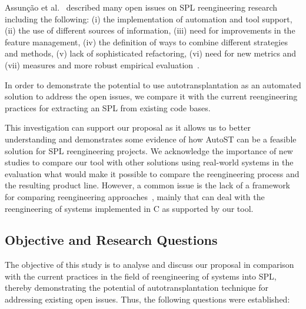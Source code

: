 Assunção et al.~\cite{Assuncao2017} described many open issues on SPL reengineering research including the following: (i) the implementation of automation and tool support, (ii) the use of different sources of information, (iii) need for improvements in the feature management, (iv) the definition of ways to combine different strategies and methods, (v) lack of sophisticated refactoring, (vi) need for new metrics and (vii) measures and more robust empirical evaluation~\cite{Assuncao2017}.

In order to demonstrate the potential to use autotransplantation as an automated solution to address the open issues, we compare it with the current reengineering practices for extracting an SPL from existing code bases. 

This investigation can support our proposal as it allows us to better understanding and demonstrates some evidence of how AutoST can be a feasible solution for SPL reengineering projects. We acknowledge the importance of new studies to compare our tool with other solutions using real-world systems in the evaluation what would make it possible to compare the reengineering process and the resulting product line. However,  a common issue is the lack of a framework for comparing reengineering approaches~\cite{Assuncao2017}, mainly that can deal with the reengineering of systems implemented in C as supported by our tool.

\subsection{Objective and Research Questions}

The objective of this study is to analyse and discuss our proposal in comparison with the current practices in the field of reengineering of systems into SPL, thereby demonstrating the potential of autotransplantation technique for addressing existing open issues. Thus, the following questions were established:


